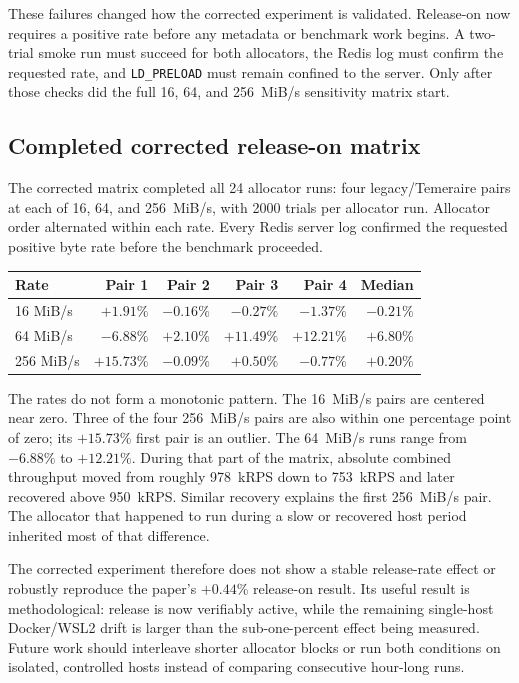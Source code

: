 \documentclass[a4paper,11pt]{article}
\begin{document}
These failures changed how the corrected experiment is validated. Release-on
now requires a positive rate before any metadata or benchmark work begins. A
two-trial smoke run must succeed for both allocators, the Redis log must confirm
the requested rate, and \texttt{LD\_PRELOAD} must remain confined to the server.
Only after those checks did the full 16, 64, and 256~MiB/s sensitivity matrix
start.

\subsection{Completed corrected release-on matrix}

The corrected matrix completed all 24 allocator runs: four legacy/Temeraire
pairs at each of 16, 64, and 256~MiB/s, with 2000 trials per allocator run.
Allocator order alternated within each rate. Every Redis server log confirmed
the requested positive byte rate before the benchmark proceeded.

\begin{center}
\begin{tabular}{@{}lrrrrr@{}}
\toprule
Rate & Pair 1 & Pair 2 & Pair 3 & Pair 4 & Median \\
\midrule
16 MiB/s  & $+1.91\%$ & $-0.16\%$ & $-0.27\%$ & $-1.37\%$ & $-0.21\%$ \\
64 MiB/s  & $-6.88\%$ & $+2.10\%$ & $+11.49\%$ & $+12.21\%$ & $+6.80\%$ \\
256 MiB/s & $+15.73\%$ & $-0.09\%$ & $+0.50\%$ & $-0.77\%$ & $+0.20\%$ \\
\bottomrule
\end{tabular}
\end{center}

The rates do not form a monotonic pattern. The 16~MiB/s pairs are centered
near zero. Three of the four 256~MiB/s pairs are also within one percentage
point of zero; its $+15.73\%$ first pair is an outlier. The 64~MiB/s runs range
from $-6.88\%$ to $+12.21\%$. During that part of the matrix, absolute combined
throughput moved from roughly 978~kRPS down to 753~kRPS and later recovered
above 950~kRPS. Similar recovery explains the first 256~MiB/s pair. The
allocator that happened to run during a slow or recovered host period inherited
most of that difference.

The corrected experiment therefore does not show a stable release-rate effect
or robustly reproduce the paper's $+0.44\%$ release-on result. Its useful result
is methodological: release is now verifiably active, while the remaining
single-host Docker/WSL2 drift is larger than the sub-one-percent effect being
measured. Future work should interleave shorter allocator blocks or run both
conditions on isolated, controlled hosts instead of comparing consecutive
hour-long runs.
\end{document}

